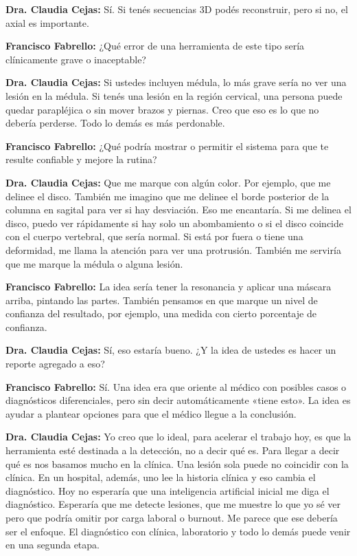 \noindent\textbf{Dra. Claudia Cejas:} Sí. Si tenés secuencias 3D podés reconstruir, pero si no, el axial es importante.

\noindent\textbf{Francisco Fabrello:} ¿Qué error de una herramienta de este tipo sería clínicamente grave o inaceptable?

\noindent\textbf{Dra. Claudia Cejas:} Si ustedes incluyen médula, lo más grave sería no ver una lesión en la médula. Si tenés una lesión en la región cervical, una persona puede quedar parapléjica o sin mover brazos y piernas. Creo que eso es lo que no debería perderse. Todo lo demás es más perdonable.

\noindent\textbf{Francisco Fabrello:} ¿Qué podría mostrar o permitir el sistema para que te resulte confiable y mejore la rutina?

\noindent\textbf{Dra. Claudia Cejas:} Que me marque con algún color. Por ejemplo, que me delinee el disco. También me imagino que me delinee el borde posterior de la columna en sagital para ver si hay desviación. Eso me encantaría. Si me delinea el disco, puedo ver rápidamente si hay solo un abombamiento o si el disco coincide con el cuerpo vertebral, que sería normal. Si está por fuera o tiene una deformidad, me llama la atención para ver una protrusión. También me serviría que me marque la médula o alguna lesión.

\noindent\textbf{Francisco Fabrello:} La idea sería tener la resonancia y aplicar una máscara arriba, pintando las partes. También pensamos en que marque un nivel de confianza del resultado, por ejemplo, una medida con cierto porcentaje de confianza.

\noindent\textbf{Dra. Claudia Cejas:} Sí, eso estaría bueno. ¿Y la idea de ustedes es hacer un reporte agregado a eso?

\noindent\textbf{Francisco Fabrello:} Sí. Una idea era que oriente al médico con posibles casos o diagnósticos diferenciales, pero sin decir automáticamente «tiene esto». La idea es ayudar a plantear opciones para que el médico llegue a la conclusión.

\noindent\textbf{Dra. Claudia Cejas:} Yo creo que lo ideal, para acelerar el trabajo hoy, es que la herramienta esté destinada a la detección, no a decir qué es. Para llegar a decir qué es nos basamos mucho en la clínica. Una lesión sola puede no coincidir con la clínica. En un hospital, además, uno lee la historia clínica y eso cambia el diagnóstico. Hoy no esperaría que una inteligencia artificial inicial me diga el diagnóstico. Esperaría que me detecte lesiones, que me muestre lo que yo sé ver pero que podría omitir por carga laboral o burnout. Me parece que ese debería ser el enfoque. El diagnóstico con clínica, laboratorio y todo lo demás puede venir en una segunda etapa.

